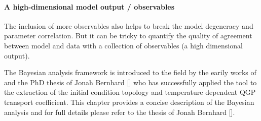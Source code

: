 \paragraph{A high-dimensional model output / observables}
The inclusion of more observables also helps to break the model degeneracy and parameter correlation.
But it can be tricky to quantify the quality of agreement between model and data with a collection of observables (a high dimensional output).


The Bayesian analysis framework is introduced to the field by the earily works of and the PhD thesis of Jonah Bernhard [] who has successfully applied the tool to the extraction of the initial condition topology and temperature dependent QGP transport coefficient.
This chapter provides a concise description of the Bayesian analysis and for full details please refer to the thesis of Jonah Bernhard [].